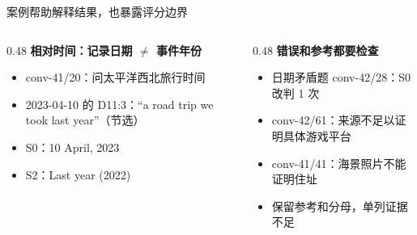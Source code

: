 \documentclass[aspectratio=169,10pt]{beamer}
\begin{document}
\begin{frame}{案例帮助解释结果，也暴露评分边界}
\small
\begin{columns}[T]
\begin{column}{0.48\textwidth}
\textbf{相对时间：记录日期 $\ne$ 事件年份}\par\vspace{3mm}
\begin{itemize}
\item conv-41/20：问太平洋西北旅行时间
\item 2023-04-10 的 D11:3：“a road trip we took last year”（节选）
\item S0：10 April, 2023
\item S2：Last year (2022)
\end{itemize}\end{column}
\begin{column}{0.48\textwidth}
\textbf{错误和参考都要检查}\par\vspace{3mm}
\begin{itemize}
\item 日期矛盾题 conv-42/28：S0 改判 1 次
\item conv-42/61：来源不足以证明具体游戏平台
\item conv-41/41：海景照片不能证明住址
\item 保留参考和分母，单列证据不足
\end{itemize}\end{column}
\end{columns}
\end{frame}
\end{document}
